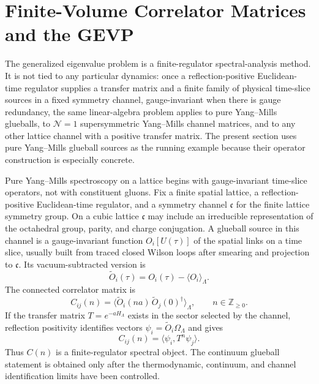 \section{Finite-Volume Correlator Matrices and the GEVP}
\label{sec:lattice-glueball-correlator-gevp}

The generalized eigenvalue problem is a finite-regulator spectral-analysis
method.  It is not tied to any particular dynamics: once a reflection-positive
Euclidean-time regulator supplies a transfer matrix and a finite family of
physical time-slice sources in a fixed symmetry channel, gauge-invariant when
there is gauge redundancy, the same
linear-algebra problem applies to pure Yang--Mills glueballs, to
\(\mathcal N=1\) supersymmetric Yang--Mills channel matrices, and to any
other lattice channel with a positive transfer matrix.  The present section
uses pure Yang--Mills glueball sources as the running example because their
operator construction is especially concrete.

Pure Yang--Mills spectroscopy on a lattice begins with gauge-invariant
time-slice operators, not with constituent gluons.  Fix a finite spatial
lattice, a reflection-positive Euclidean-time regulator, and a symmetry
channel \(\mathfrak c\) for the finite lattice symmetry group.  On a cubic
lattice \(\mathfrak c\) may include an irreducible representation of the
octahedral group, parity, and charge conjugation.  A glueball source in this
channel is a gauge-invariant function \(O_i[U(\tau)]\) of the spatial links
on a time slice, usually built from traced closed Wilson loops after
smearing and projection to \(\mathfrak c\).  Its vacuum-subtracted version is
\begin{equation}
  \widetilde O_i(\tau)
  =
  O_i(\tau)-\langle O_i\rangle_\Lambda .
  \label{eq:lattice-glueball-vacuum-subtracted-source}
\end{equation}
The connected correlator matrix is
\begin{equation}
  C_{ij}(n)
  =
  \langle \widetilde O_i(n a)\,
  \widetilde O_j(0)^\dagger\rangle_\Lambda ,
  \qquad n\in\mathbb Z_{\ge0}.
  \label{eq:lattice-glueball-correlator-matrix}
\end{equation}
If the transfer matrix \(T=e^{-aH_\Lambda}\) exists in the sector selected
by the channel, reflection positivity identifies vectors
\(\psi_i=\widetilde O_i\Omega_\Lambda\) and gives
\begin{equation}
  C_{ij}(n)=\langle \psi_i,T^n\psi_j\rangle .
  \label{eq:lattice-glueball-transfer-matrix-correlator}
\end{equation}
Thus \(C(n)\) is a finite-regulator spectral object.  The continuum glueball
statement is obtained only after the thermodynamic, continuum, and channel
identification limits have been controlled.

